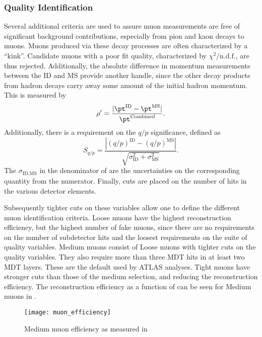 \subsubsection{Quality Identification}

Several additional criteria are used to assure muon measurements are free of significant background contributions, especially from pion and kaon decays to muons.
Muons produced via these decay processes are often characterized by a ``kink''.
Candidate muons with a poor fit quality, characterized by $\chi^2/\text{n.d.f.}$, are thus rejected.
Additionally, the absolute difference in momentum measurements between the ID and MS provide another handle, since the other decay products from hadron decays carry away some amount of the initial hadron momentum.
This is measured by
\begin{equation}
\rho' = \frac{|\pt^{\text{ID}} - \pt^{\text{MS}} |}{\pt^{\text{Combined}}}.
\end{equation}
Additionally, there is a requirement on the $q/p$ significance, defined as
\begin{equation}\label{eq:muon_sig}
S_{q/p} = \frac{|(q/p)^{\text{ID}} - (q/p)^{\text{MS}} |}{\sqrt{\sigma_{\text{ID}}^2 + \sigma_{\text{MS}}^2  }}.
\end{equation}
The $\sigma_{\text{ID,MS}}$ in the denominator of  are the uncertainties on the corresponding quantity from the numerator.
Finally, cuts are placed on the number of hits in the various detector elements.

Subsequently tighter cuts on these variables allow one to define the different muon identification criteria.
Loose muons have the highest reconstruction efficiency, but the highest number of fake muons, since there are no requirements on the number of subdetector hits and the loosest requirements on the suite of quality variables.
Medium muons consist of Loose muons with tighter cuts on the quality variables.
They also require more than three MDT hits in at least two MDT layers.
These are the default used by ATLAS analyses.
Tight muons have stronger cuts than those of the medium selection, and reducing the reconstruction efficiency.
The reconstruction efficiency as a function of \pt can be seen for Medium muons in .

\begin{figure}
\caption{Medium muon efficiency as measured in ~\cite{PERF-2015-10}} \label{fig:muon_eff}
\texttt{[image: muon\_efficiency]}
\end{figure}

